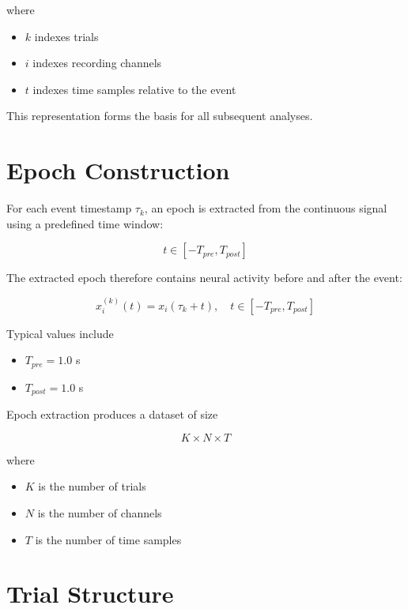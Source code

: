\documentclass[11pt]{report}
\begin{document}
where

\begin{itemize}
\item $k$ indexes trials
\item $i$ indexes recording channels
\item $t$ indexes time samples relative to the event
\end{itemize}

This representation forms the basis for all subsequent analyses.

\section{Epoch Construction}

For each event timestamp $\tau_k$, an epoch is extracted from the
continuous signal using a predefined time window:

\begin{equation}
t \in [-T_{pre}, T_{post}]
\end{equation}

The extracted epoch therefore contains neural activity before and
after the event:

\begin{equation}
x_i^{(k)}(t) =
x_i(\tau_k + t),
\quad
t \in [-T_{pre}, T_{post}]
\end{equation}

Typical values include

\begin{itemize}
\item $T_{pre} = 1.0$ s
\item $T_{post} = 1.0$ s
\end{itemize}

Epoch extraction produces a dataset of size

\begin{equation}
K \times N \times T
\end{equation}

where

\begin{itemize}
\item $K$ is the number of trials
\item $N$ is the number of channels
\item $T$ is the number of time samples
\end{itemize}

\section{Trial Structure}
\end{document}
